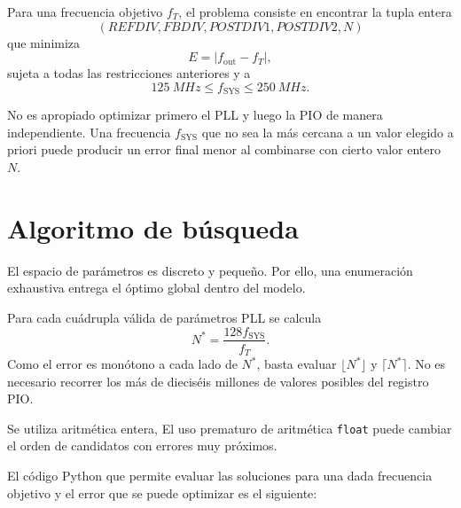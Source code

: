 \documentclass[11pt,a4paper]{article}
\begin{document}
Para una frecuencia objetivo \(f_T\), el problema consiste en encontrar la
tupla entera
\begin{equation}
 (REFDIV,FBDIV,POSTDIV1,POSTDIV2,N)
\end{equation}
que minimiza
\begin{equation}
 E=\left|f_{\mathrm{out}}-f_T\right|,
 \label{eq:objective}
\end{equation}
sujeta a todas las restricciones anteriores y a
\begin{equation}
 \SI{125}{MHz}\le f_{\mathrm{SYS}}\le\SI{250}{MHz}.
\end{equation}

No es apropiado optimizar primero el PLL y luego la PIO de manera independiente.
Una frecuencia \(f_{\mathrm{SYS}}\) que no sea la más cercana a un valor elegido
a priori puede producir un error final menor al combinarse con cierto valor
entero \(N\).

\section{Algoritmo de búsqueda}

El espacio de parámetros es discreto y pequeño. Por ello, una enumeración
exhaustiva entrega el óptimo global dentro del modelo.

Para cada cuádrupla válida de parámetros PLL se calcula
\begin{equation}
 N^*=\frac{128f_{\mathrm{SYS}}}{f_T}.
\end{equation}
Como el error es monótono a cada lado de \(N^*\), basta evaluar
\(\lfloor N^*\rfloor\) y \(\lceil N^*\rceil\). No es necesario recorrer los
más de dieciséis millones de valores posibles del registro PIO.

Se utiliza  aritmética entera, El uso prematuro de aritmética \texttt{float} puede cambiar el orden de candidatos con errores muy próximos.

El código Python que permite evaluar las soluciones para una dada frecuencia objetivo y el error que
se puede optimizar es el siguiente:
\end{document}
